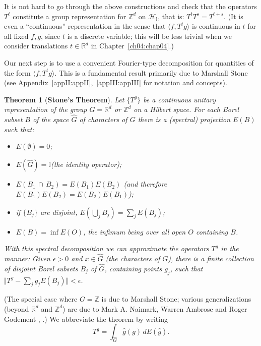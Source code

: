 \documentclass[reqno]{stml-l}
\theoremstyle{plain}
\newtheorem{theorem}{Theorem}[chapter]
\theoremstyle{definition}
\numberwithin{equation}{chapter}
\begin{document}
It is not hard to go through the above constructions and check that the operators $T^{t}$ constitute a group representation for $\mathbb{Z}^{d}$ on $\mathcal{H}_{\mathbb{I}}$, that is: $T^{t}T^{s}=T^{t+s}$. (It is even a ``continuous'' representation in the sense that $\langle f, T^{t}g\rangle$ is continuous in $t$ for all fixed $f,g$, since $t$ is a discrete variable; this will be less trivial when we consider translations $t\in \mathbb{R}^{d}$ in Chapter~\ref{ch04:chap04}.)

Our next step is to use a convenient Fourier-type decomposition for quantities of the form $\langle f, T^{t}g\rangle$. This is a fundamental result primarily due to Marshall Stone (see Appendix~\ref{appII:appII},~\ref{appIII:appIII} for notation and concepts).

\begin{theorem}[{\bf Stone's Theorem}]\label{ch03:thm3.1}
Let $\{T^{g}\}$ be a continuous unitary representation of the group $G=\mathbb{R}^{d}$ or $\mathbb{Z}^{d}$ on a Hilbert space. For each Borel subset $B$ of the space $\hat{G}$ of characters of $G$ there is a (spectral) projection $E(B)$ such that:
\begin{itemize}
\item $E(\emptyset)=0$;
\item $E(\hat{G})=\mathbb{I}$(the identity operator);
\item $E(B_{1}\,\cap\,B_{2})=E(B_{1})E(B_{2})$ (and therefore $E(B_{1})E(B_{2})=
E(B_{2})E(B_{1})$);
\item if $\{B_{j}\}$ are disjoint, $E(\bigcup_{j}B_{j})=\sum\nolimits_{j}E(B_{j})$;
\item $E(B)=\inf E(O)$, the infimum being over all open $O$ containing $B$.
\end{itemize}
With this spectral decomposition we can approximate the operators $T^{g}$ in the manner: Given $\epsilon>0$ and $x\in\hat{G}$ (the characters of $G$), there is a finite collection of disjoint Borel subsets $B_{j}$ of $\hat{G}$, containing points $g_{j}$, such that $\Vert T^{g}-\sum\nolimits_{j}g_{j}E(B_{j})\Vert<\epsilon$.
\end{theorem}

(The special case where $G=\mathbb{Z}$ is due to Marshall Stone; various generalizations (beyond $\mathbb{R}^{d}$ and $\mathbb{Z}^{d}$) are due to Mark A. Naimark, Warren Ambrose and Roger Godement \cite[p. 392]{bib:RiN}, \cite[p. 419]{bib:Nai}.) We abbreviate the theorem by writing
\begin{equation}
T^{g}=\int_{\hat{G}}\hat{g}(g)\,dE(\hat{g}).\label{ch03:eqn3.2}
\end{equation}
\end{document}

